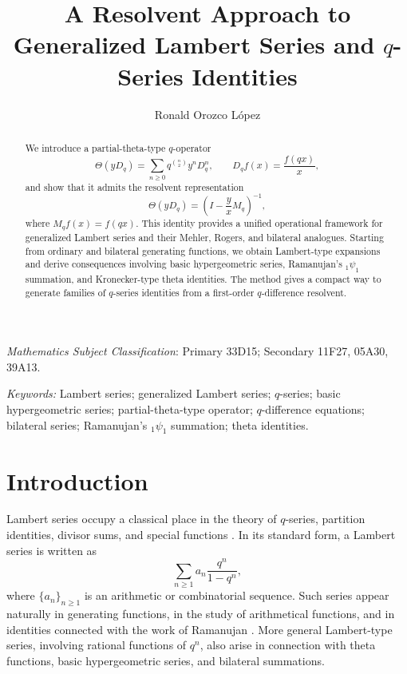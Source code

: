 \documentclass[12pt]{article}
\begin{document}
\title{\textbf{A Resolvent Approach to Generalized Lambert Series and $q$-Series Identities}}
\author{Ronald Orozco L\'opez}

\newcommand{\Addresses}{{%
  \bigskip
  \footnotesize

  \textit{E-mail address}, R.~Orozco: \texttt{rj.orozco@uniandes.edu.co}
  
}}



\maketitle

\begin{abstract}
We introduce a partial-theta-type \(q\)-operator
$$
\Theta(yD_q)=\sum_{n\ge0}q^{\binom n2}y^nD_q^n,
\qquad
D_qf(x)=\frac{f(qx)}{x},
$$
and show that it admits the resolvent representation
$$
\Theta(yD_q)=\left(I-\frac yxM_q\right)^{-1},
$$
where $M_qf(x)=f(qx)$. This identity provides a unified operational
framework for generalized Lambert series and their Mehler, Rogers, and
bilateral analogues. Starting from ordinary and bilateral generating
functions, we obtain Lambert-type expansions and derive consequences
involving basic hypergeometric series, Ramanujan's ${}_1\psi_1$
summation, and Kronecker-type theta identities. The method gives a
compact way to generate families of $q$-series identities from a
first-order $q$-difference resolvent.
\end{abstract}
 {\it Mathematics Subject Classification}:
Primary 33D15; Secondary 11F27, 05A30, 39A13.

\noindent \emph{Keywords: } Lambert series; generalized Lambert series; $q$-series; basic hypergeometric series; partial-theta-type operator; $q$-difference equations; bilateral series; Ramanujan's
${}_1\psi_1$ summation; theta identities.


\section{Introduction}

Lambert series occupy a classical place in the theory of \(q\)-series,
partition identities, divisor sums, and special functions
\cite{agarwal,Berndt1999Lambert,Andrews1986}. In its
standard form, a Lambert series is written as
\[
   \sum_{n\ge 1} a_n \frac{q^n}{1-q^n},
\]
where \(\{a_n\}_{n\ge1}\) is an arithmetic or combinatorial sequence.
Such series appear naturally in generating functions, in the study of
arithmetical functions, and in identities connected with the work of Ramanujan
\cite{agarwal,Berndt1991,AdigaBerndtBhargavaWatson1985}. More general Lambert-type series, involving rational
functions of \(q^n\), also arise in connection with theta functions,
basic hypergeometric series, and bilateral summations.
\end{document}
